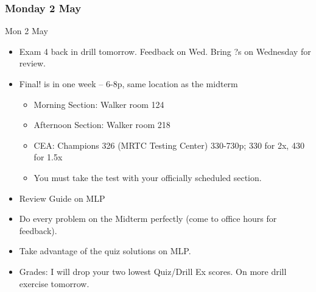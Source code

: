\documentclass[cal1spr16Lectures.tex]{subfiles}
\begin{document}

\subsubsection{\bf Monday 2 May}

\begin{frame}[allowframebreaks]{Mon 2 May}
\begin{itemize}\small
\item Exam 4 back in drill tomorrow.  Feedback on Wed.  Bring ?s on Wednesday for review.
\item Final! is in one week  -- 6-8p, same location as the midterm
\begin{itemize}\footnotesize
	\item Morning Section: Walker room 124
	\item Afternoon Section: Walker room 218
	\item CEA: Champions 326 (MRTC Testing Center) 330-730p; 330 for 2x, 430 for 1.5x
	\item You \alert{must} take the test with your officially scheduled section.
\end{itemize}
\item Review Guide on MLP
\item Do every problem on the Midterm perfectly (come to office hours for feedback).
\item Take advantage of the quiz solutions on MLP.
\item Grades: I will drop your two lowest Quiz/Drill Ex scores.  On more drill exercise tomorrow.
\end{itemize}
\end{frame}


\end{document}
